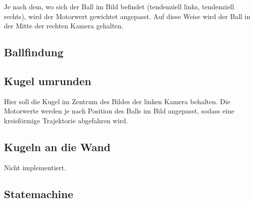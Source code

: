 \documentclass{../Vorlage/mat}
\begin{document}
Je nach dem, wo sich der Ball im Bild befindet (tendenziell links, tendenziell rechts), wird der Motorwert  gewichtet angepasst. Auf diese Weise wird der Ball in der Mitte der rechten Kamera gehalten.
\subsection*{Ballfindung}


\subsection*{Kugel umrunden}
Hier soll die Kugel im Zentrum des Bildes der linken Kamera behalten. Die Motorwerte werden je nach Position des Balls im Bild angepasst, sodass eine kreisförmige Trajektorie abgefahren wird.


\subsection*{Kugeln an die Wand}
Nicht implementiert.

\subsection*{Statemachine}

\end{document}
